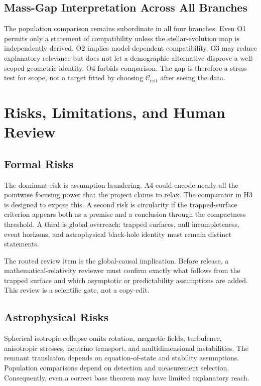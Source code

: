 \documentclass[conference]{IEEEtran}
\newcommand{\Ccrit}{\mathcal{C}_{\mathrm{crit}}}
\begin{document}
\subsection{Mass-Gap Interpretation Across All Branches}
The population comparison remains subordinate in all four branches. Even O1 permits only a statement of compatibility unless the stellar-evolution map is independently derived. O2 implies model-dependent compatibility. O3 may reduce explanatory relevance but does not let a demographic alternative disprove a well-scoped geometric identity. O4 forbids comparison. The gap is therefore a stress test for scope, not a target fitted by choosing $\Ccrit$ after seeing the data.

\section{Risks, Limitations, and Human Review}
\label{sec:risks}

\subsection{Formal Risks}
The dominant risk is assumption laundering: A4 could encode nearly all the pointwise focusing power that the project claims to relax. The comparator in H3 is designed to expose this. A second risk is circularity if the trapped-surface criterion appears both as a premise and a conclusion through the compactness threshold. A third is global overreach: trapped surfaces, null incompleteness, event horizons, and astrophysical black-hole identity must remain distinct statements.

The routed review item is the global-causal implication. Before release, a mathematical-relativity reviewer must confirm exactly what follows from the trapped surface and which asymptotic or predictability assumptions are added. This review is a scientific gate, not a copy-edit.

\subsection{Astrophysical Risks}
Spherical isotropic collapse omits rotation, magnetic fields, turbulence, anisotropic stresses, neutrino transport, and multidimensional instabilities. The remnant translation depends on equation-of-state and stability assumptions. Population comparisons depend on detection and measurement selection. Consequently, even a correct base theorem may have limited explanatory reach.
\end{document}
